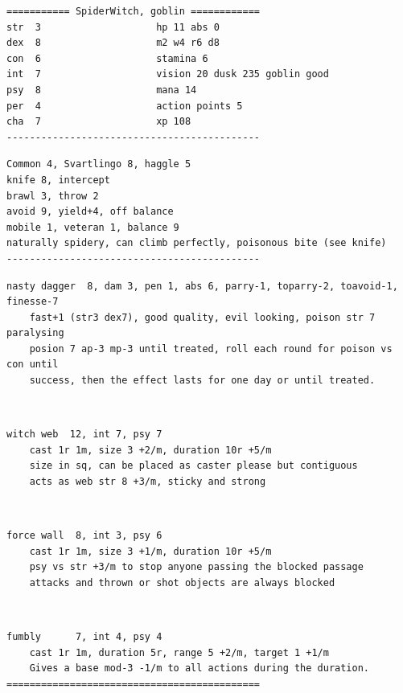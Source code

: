 \small \begin{samepage} \begin{verbatim}
=========== SpiderWitch, goblin ============
str  3                    hp 11 abs 0
dex  8                    m2 w4 r6 d8
con  6                    stamina 6
int  7                    vision 20 dusk 235 goblin good
psy  8                    mana 14
per  4                    action points 5
cha  7                    xp 108
--------------------------------------------
\end{verbatim} \end{samepage} \goodbreak \begin{samepage} \begin{verbatim}
Common 4, Svartlingo 8, haggle 5
knife 8, intercept
brawl 3, throw 2
avoid 9, yield+4, off balance
mobile 1, veteran 1, balance 9
naturally spidery, can climb perfectly, poisonous bite (see knife)
--------------------------------------------
\end{verbatim} \end{samepage} \goodbreak \begin{samepage} \begin{verbatim}
nasty dagger  8, dam 3, pen 1, abs 6, parry-1, toparry-2, toavoid-1, finesse-7
    fast+1 (str3 dex7), good quality, evil looking, poison str 7 paralysing
    posion 7 ap-3 mp-3 until treated, roll each round for poison vs con until
    success, then the effect lasts for one day or until treated.
\end{verbatim} \end{samepage}   \   \goodbreak \begin{samepage} \begin{verbatim}
witch web  12, int 7, psy 7
    cast 1r 1m, size 3 +2/m, duration 10r +5/m
    size in sq, can be placed as caster please but contiguous
    acts as web str 8 +3/m, sticky and strong
\end{verbatim} \end{samepage}   \   \goodbreak \begin{samepage} \begin{verbatim}
force wall  8, int 3, psy 6
    cast 1r 1m, size 3 +1/m, duration 10r +5/m
    psy vs str +3/m to stop anyone passing the blocked passage
    attacks and thrown or shot objects are always blocked
\end{verbatim} \end{samepage}   \   \goodbreak \begin{samepage} \begin{verbatim}
fumbly      7, int 4, psy 4
    cast 1r 1m, duration 5r, range 5 +2/m, target 1 +1/m
    Gives a base mod-3 -1/m to all actions during the duration.
============================================
\end{verbatim} \end{samepage} \normalsize

